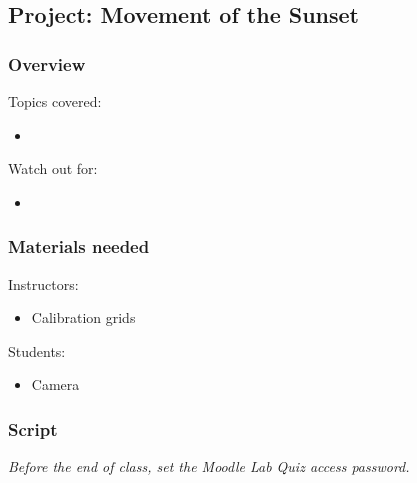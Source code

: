 \documentclass[12pt]{article}
\begin{document}
\newpage
\subsection{Project: Movement of the Sunset}

\subsubsection{Overview}

Topics covered:
\begin{itemize}
\item 
\end{itemize}

\noindent
Watch out for:
\begin{itemize}
\item 
\end{itemize}


\subsubsection{Materials needed}

Instructors:
\begin{itemize}
\item Calibration grids
\end{itemize}

\noindent
Students:
\begin{itemize}
\item Camera
\end{itemize}


\subsubsection{Script}


\emph{Before the end of class, set the Moodle Lab Quiz access password.}
\end{document}
